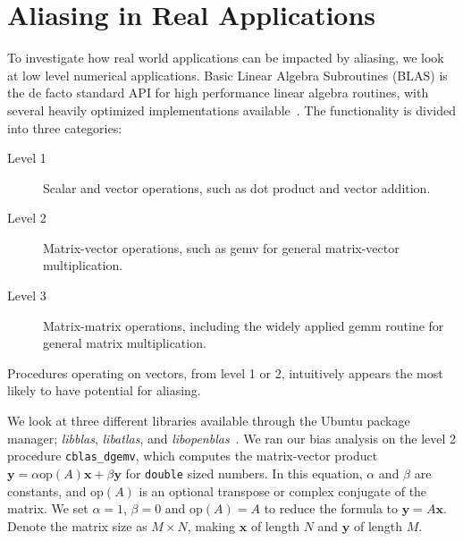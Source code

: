 \documentclass[10pt, conference, compsocconf]{IEEEtran}
\begin{document}
\section{Aliasing in Real Applications}
\label{sec:blas}
To investigate how real world applications can be impacted by aliasing, we look at low level numerical applications.
Basic Linear Algebra Subroutines (BLAS) is the de facto standard API for high performance linear algebra routines, with several heavily optimized implementations available~\cite{Blackford:2002:UpdatedBLAS}.
The functionality is divided into three categories:
\begin{description}
  \item[Level 1] \hspace{0.1cm} Scalar and vector operations, such as dot product and vector addition.
  \item[Level 2] \hspace{0.1cm} Matrix-vector operations, such as gemv for general matrix-vector multiplication.
  \item[Level 3] \hspace{0.1cm} Matrix-matrix operations, including the widely applied gemm routine for general matrix multiplication.
\end{description}
Procedures operating on vectors, from level 1 or 2, intuitively appears the most likely to have potential for aliasing.

We look at three different libraries available through the Ubuntu package manager; \emph{libblas}, \emph{libatlas}, and \emph{libopenblas}~\cite{Whaley:1998:ATLAS,Wang:2013:OpenBLAS}.
We ran our bias analysis on the level 2 procedure \texttt{cblas\_dgemv}, which computes the matrix-vector product $\boldsymbol{y} = \alpha\text{op}\left(A\right)\boldsymbol{x} + \beta\boldsymbol{y}$ for \texttt{double} sized numbers.
In this equation,  $\alpha$ and $\beta$ are constants, and $\text{op}\left(A\right)$ is an optional transpose or complex conjugate of the matrix.
We set $\alpha = 1$, $\beta = 0$ and $\text{op} \left(A\right) = A$ to reduce the formula to $\boldsymbol{y}=A\boldsymbol{x}$.
Denote the matrix size as $M \times N$, making $\boldsymbol{x}$ of length $N$ and $\boldsymbol{y}$ of length $M$.
\end{document}
